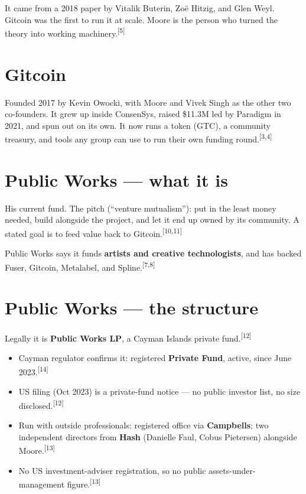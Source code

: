 \documentclass[11pt]{article}
\newcommand{\refn}[1]{\textsuperscript{[#1]}}
\begin{document}
It came from a 2018 paper by Vitalik Buterin, Zoë Hitzig, and Glen Weyl.
Gitcoin was the first to run it at scale. Moore is the person who turned the
theory into working machinery.\refn{5}

\section{Gitcoin}

Founded 2017 by Kevin Owocki, with Moore and Vivek Singh as the other two
co-founders. It grew up inside ConsenSys, raised \$11.3M led by Paradigm in
2021, and spun out on its own. It now runs a token (GTC), a community
treasury, and tools any group can use to run their own funding
round.\refn{3,4}

\section{Public Works --- what it is}

His current fund. The pitch (``venture mutualism''): put in the least money
needed, build alongside the project, and let it end up owned by its
community. A stated goal is to feed value back to Gitcoin.\refn{10,11}

Public Works says it funds \textbf{artists and creative technologists}, and
has backed Fuser, Gitcoin, Metalabel, and Spline.\refn{7,8}

\section{Public Works --- the structure}

Legally it is \textbf{Public Works LP}, a Cayman Islands private fund.\refn{12}

\begin{itemize}
\item Cayman regulator confirms it: registered \textbf{Private Fund},
active, since June 2023.\refn{14}
\item US filing (Oct 2023) is a private-fund notice --- no public investor
list, no size disclosed.\refn{12}
\item Run with outside professionals: registered office via \textbf{Campbells};
two independent directors from \textbf{Hash} (Danielle Faul, Cobus
Pietersen) alongside Moore.\refn{13}
\item No US investment-adviser registration, so no public assets-under-
management figure.\refn{13}
\end{itemize}
\end{document}
